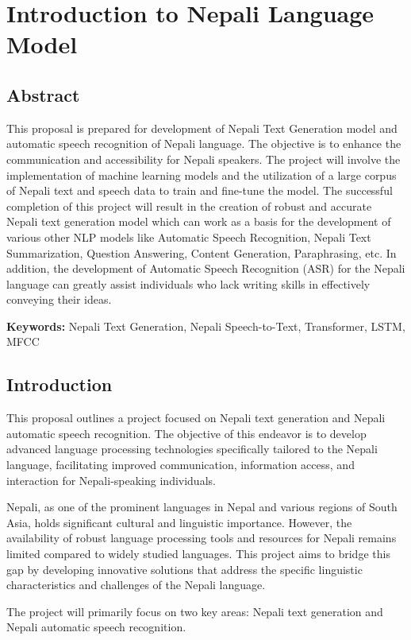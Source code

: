 \chapter{Introduction to Nepali Language Model}
\section{Abstract}
This proposal is prepared for development of Nepali Text Generation model and automatic speech recognition of Nepali language. The objective is to enhance the communication and accessibility for Nepali speakers. The project will involve the implementation of machine learning models and the utilization of a large corpus of Nepali text and speech data to train and fine-tune the model. The successful completion of this project will result in the creation of robust and accurate Nepali text generation model which can work as a basis for the development of various other NLP models like Automatic Speech Recognition, Nepali Text Summarization, Question Answering, Content Generation, Paraphrasing, etc. In addition, the development of Automatic Speech Recognition (ASR) for the Nepali language can greatly assist individuals who lack writing skills in effectively conveying their ideas.


\textbf{Keywords: } Nepali Text Generation, Nepali Speech-to-Text, Transformer, LSTM, MFCC


\section{Introduction}
This proposal outlines a project focused on Nepali text generation and Nepali automatic speech recognition. The objective of this endeavor is to develop advanced language processing technologies specifically tailored to the Nepali language, facilitating improved communication, information access, and interaction for Nepali-speaking individuals.

Nepali, as one of the prominent languages in Nepal and various regions of South Asia, holds significant cultural and linguistic importance. However, the availability of robust language processing tools and resources for Nepali remains limited compared to widely studied languages. This project aims to bridge this gap by developing innovative solutions that address the specific linguistic characteristics and challenges of the Nepali language.

The project will primarily focus on two key areas: Nepali text generation and Nepali automatic speech recognition.


